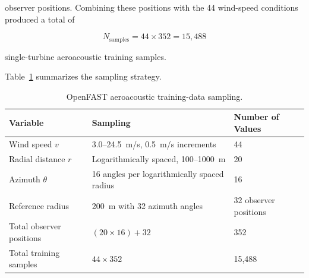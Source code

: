 \documentclass[11pt]{article}
\begin{document}
observer positions. Combining these positions with the 44 wind-speed conditions produced a total of

\begin{equation}
    N_{\mathrm{samples}}
    = 44 \times 352
    = 15{,}488
\end{equation}

single-turbine aeroacoustic training samples.

Table~\ref{tab:aa-training-data} summarizes the sampling strategy.

\begin{table}[htbp]
    \centering
    \caption{OpenFAST aeroacoustic training-data sampling.}
    \label{tab:aa-training-data}

    \begin{tabular}{lll}
        \toprule
        Variable & Sampling & Number of Values \\
        \midrule
        Wind speed $v$
            & 3.0--24.5~m/s, 0.5~m/s increments
            & 44 \\

        Radial distance $r$
            & Logarithmically spaced, 100--1000~m
            & 20 \\

        Azimuth $\theta$
            & 16 angles per logarithmically spaced radius
            & 16 \\

        Reference radius
            & 200~m with 32 azimuth angles
            & 32 observer positions \\
        \midrule
        Total observer positions
            & $(20 \times 16) + 32$
            & 352 \\

        Total training samples
            & $44 \times 352$
            & 15,488 \\
        \bottomrule
    \end{tabular}
\end{table}
\end{document}
